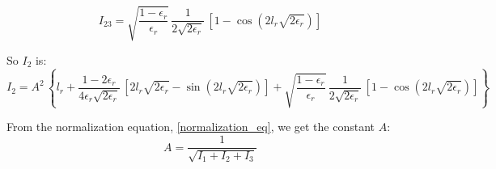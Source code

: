 \begin{equation}
\label{I23}
I_{23} =
\sqrt{\frac{1-\epsilon_r}{\epsilon_r}}\,
\frac{1}{2\sqrt{2\epsilon_r}}\,
\left[1 - \cos\left(2l_r\sqrt{2\epsilon_r}\right)\right]
\end{equation}

So $I_2$ is:
\begin{equation}
\label{I2}
I_2 
= A^2\,
\left\lbrace
l_r
+
\frac{1-2\epsilon_r}{4\epsilon_r\sqrt{2\epsilon_r}}\,
\left[
2l_r\sqrt{2\epsilon_r}
- \sin\left(2l_r\sqrt{2\epsilon_r}\right)
\right]
+
\sqrt{\frac{1-\epsilon_r}{\epsilon_r}}\,
\frac{1}{2\sqrt{2\epsilon_r}}\,
\left[1 - \cos\left(2l_r\sqrt{2\epsilon_r}\right)\right]
\right\rbrace
\end{equation}

From the normalization equation, \ref{normalization_eq}, we get the
constant $A$:
\[
A = \frac{1}{\sqrt{I_1 + I_2 + I_3}}
\]

